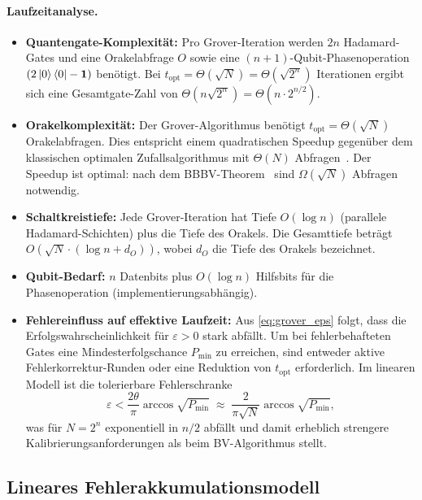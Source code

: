 ﻿\documentclass[11pt,a4paper]{article}
\theoremstyle{definition}
\newcommand{\eps}{\varepsilon}
\begin{document}
\paragraph{Laufzeitanalyse.}
\begin{itemize}[leftmargin=*]
  \item \textbf{Quantengate-Komplexität:} Pro Grover-Iteration werden
    $2n$ Hadamard-Gates und eine Orakelabfrage $O$ sowie eine
    $(n{+}1)$-Qubit-Phasenoperation $(2\ket{0}\bra{0}-\mathbf{1})$
    benötigt.  Bei $t_{\mathrm{opt}}=\Theta(\sqrt{N})=\Theta(\sqrt{2^n})$
    Iterationen ergibt sich eine Gesamtgate-Zahl von
    $\Theta(n\sqrt{2^n})=\Theta(n\cdot 2^{n/2})$.
  \item \textbf{Orakelkomplexität:} Der Grover-Algorithmus benötigt
    $t_{\mathrm{opt}} = \Theta(\sqrt{N})$ Orakelabfragen.  Dies entspricht
    einem quadratischen Speedup gegenüber dem klassischen optimalen
    Zufallsalgorithmus mit $\Theta(N)$ Abfragen~\cite{Grover1996}.
    Der Speedup ist optimal: nach dem BBBV-Theorem~\cite{Nielsen2000}
    sind $\Omega(\sqrt{N})$ Abfragen notwendig.
  \item \textbf{Schaltkreistiefe:} Jede Grover-Iteration hat Tiefe
    $O(\log n)$ (parallele Hadamard-Schichten) plus die Tiefe des
    Orakels.  Die Gesamttiefe beträgt $O(\sqrt{N}\cdot(\log n + d_O))$,
    wobei $d_O$ die Tiefe des Orakels bezeichnet.
  \item \textbf{Qubit-Bedarf:} $n$ Datenbits plus $O(\log n)$ Hilfsbits
    für die Phasenoperation (implementierungsabhängig).
  \item \textbf{Fehlereinfluss auf effektive Laufzeit:}
    Aus \eqref{eq:grover_eps} folgt, dass die Erfolgswahrscheinlichkeit
    für $\eps>0$ stark abfällt.  Um bei fehlerbehafteten Gates eine
    Mindesterfolgschance $P_{\min}$ zu erreichen, sind entweder
    aktive Fehlerkorrektur-Runden oder eine Reduktion von $t_{\mathrm{opt}}$
    erforderlich.  Im linearen Modell ist die tolerierbare Fehlerschranke
    \[
      \eps < \frac{2\theta}{\pi}\arccos\!\sqrt{P_{\min}}
      \;\approx\; \frac{2}{\pi\sqrt{N}}\arccos\!\sqrt{P_{\min}},
    \]
    was für $N=2^n$ exponentiell in $n/2$ abfällt und damit erheblich
    strengere Kalibrierungsanforderungen als beim BV-Algorithmus stellt.
\end{itemize}

\subsection{Lineares Fehlerakkumulationsmodell}
\label{subsec:grover_error}
\end{document}
